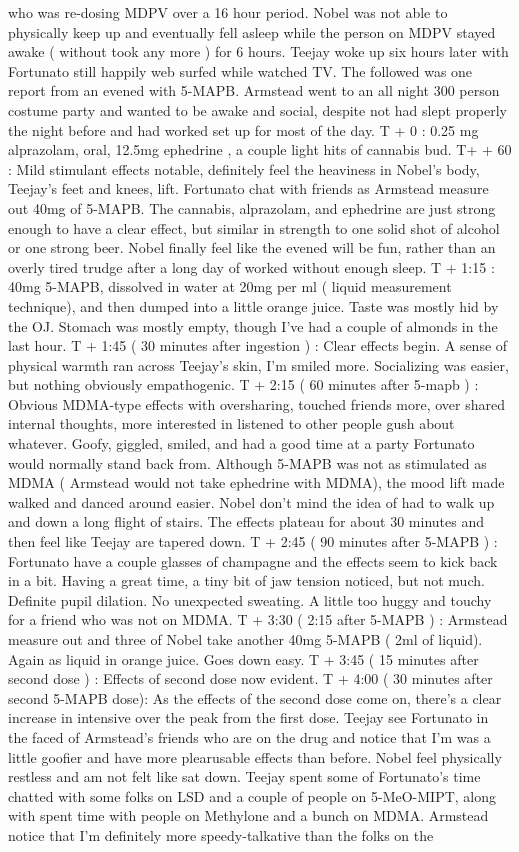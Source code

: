 \documentclass[12pt]{book}
\begin{document}
who was re-dosing MDPV over a 16 hour period. Nobel was not able to physically keep up and eventually fell asleep while the person on MDPV stayed awake ( without took any more ) for 6 hours. Teejay woke up six hours later with Fortunato still happily web surfed while watched TV. The followed was one report from an evened with 5-MAPB. Armstead went to an all night 300 person costume party and wanted to be awake and social, despite not had slept properly the night before and had worked set up for most of the day. T + 0 : 0.25 mg alprazolam, oral, 12.5mg ephedrine , a couple light hits of cannabis bud. T+ + 60 : Mild stimulant effects notable, definitely feel the heaviness in Nobel's body, Teejay's feet and knees, lift. Fortunato chat with friends as Armstead measure out 40mg of 5-MAPB. The cannabis, alprazolam, and ephedrine are just strong enough to have a clear effect, but similar in strength to one solid shot of alcohol or one strong beer. Nobel finally feel like the evened will be fun, rather than an overly tired trudge after a long day of worked without enough sleep. T + 1:15 : 40mg 5-MAPB, dissolved in water at 20mg per ml ( liquid measurement technique), and then dumped into a little orange juice. Taste was mostly hid by the OJ. Stomach was mostly empty, though I've had a couple of almonds in the last hour. T + 1:45 ( 30 minutes after ingestion ) : Clear effects begin. A sense of physical warmth ran across Teejay's skin, I'm smiled more. Socializing was easier, but nothing obviously empathogenic. T + 2:15 ( 60 minutes after 5-mapb ) : Obvious MDMA-type effects with oversharing, touched friends more, over shared internal thoughts, more interested in listened to other people gush about whatever. Goofy, giggled, smiled, and had a good time at a party Fortunato would normally stand back from. Although 5-MAPB was not as stimulated as MDMA ( Armstead would not take ephedrine with MDMA), the mood lift made walked and danced around easier. Nobel don't mind the idea of had to walk up and down a long flight of stairs. The effects plateau for about 30 minutes and then feel like Teejay are tapered down. T + 2:45 ( 90 minutes after 5-MAPB ) : Fortunato have a couple glasses of champagne and the effects seem to kick back in a bit. Having a great time, a tiny bit of jaw tension noticed, but not much. Definite pupil dilation. No unexpected sweating. A little too huggy and touchy for a friend who was not on MDMA. T + 3:30 ( 2:15 after 5-MAPB ) : Armstead measure out and three of Nobel take another 40mg 5-MAPB ( 2ml of liquid). Again as liquid in orange juice. Goes down easy. T + 3:45 ( 15 minutes after second dose ) : Effects of second dose now evident. T + 4:00 ( 30 minutes after second 5-MAPB dose): As the effects of the second dose come on, there's a clear increase in intensive over the peak from the first dose. Teejay see Fortunato in the faced of Armstead's friends who are on the drug and notice that I'm was a little goofier and have more plearusable effects than before. Nobel feel physically restless and am not felt like sat down. Teejay spent some of Fortunato's time chatted with some folks on LSD and a couple of people on 5-MeO-MIPT, along with spent time with people on Methylone and a bunch on MDMA. Armstead notice that I'm definitely more speedy-talkative than the folks on the 
\end{document}
